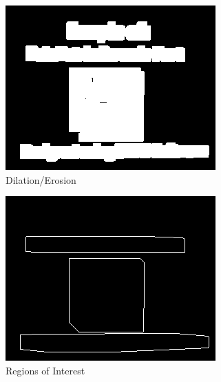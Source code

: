 \documentclass[runningheads,a4paper]{llncs}
\begin{document}
\begin{figure}
\begin{subfigure}{.3\textwidth}
  \includegraphics[width=\linewidth]{images/third}
  \caption{Dilation/Erosion}
  \label{fig:sfig2}
\end{subfigure}
\begin{subfigure}{.3\textwidth}
  \centering
  \includegraphics[width=\linewidth]{images/fourth}
  \caption{Regions of Interest}
  \label{fig:sfig2}
\end{subfigure}
\begin{subfigure}{.3\textwidth}
  \centering

\end{subfigure}
\end{figure}
\end{document}
